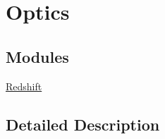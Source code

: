 \hypertarget{group___e_g_x_phys-_optics}{}\section{Optics}
\label{group___e_g_x_phys-_optics}
\subsection*{Modules}
\begin{DoxyCompactItemize}
\item 
\hyperlink{group___e_g_x_phys-_redshift}{Redshift}
\end{DoxyCompactItemize}


\subsection{Detailed Description}
